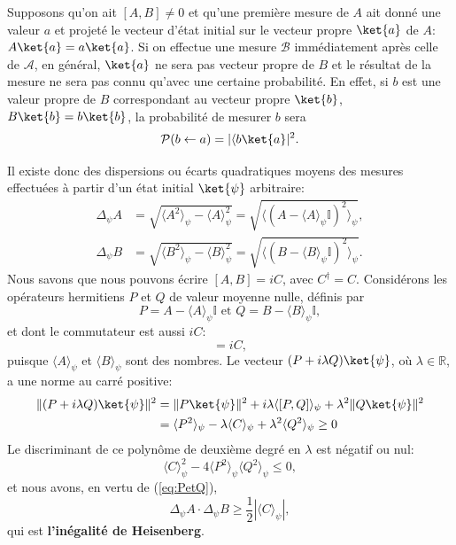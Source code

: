 Supposons qu'on ait $[A,B]\neq0$ et qu'une première mesure de $A$ ait donné une
valeur $a$ et projeté le vecteur d'état initial sur le vecteur propre $\ket{a}$
de $A$: $A\ket{a}=a\ket{a}$. Si on effectue une mesure $\mathcal{B}$
immédiatement après celle de $\mathcal{A}$, en général, $\ket{a}$ ne sera pas
vecteur propre de $B$ et le résultat de la mesure ne sera pas connu qu'avec une
certaine probabilité. En effet, si $b$ est une valeur propre de $B$
correspondant au vecteur propre $\ket{b}$, $B\ket{b}=b\ket{b}$, la probabilité
de mesurer $b$ sera%
\begin{equation}
\mathcal{P}(b\leftarrow a)=|\langle b\ket{a}|^{2}.
\end{equation}

Il existe donc des dispersions ou écarts quadratiques moyens des mesures
effectuées à partir d'un état initial $\ket{\psi}$
arbitraire:%
\begin{subequations}%
\begin{align}
\Delta_{\psi}A  &  =\sqrt{\langle A^{2}\rangle _{\psi}-\langle A\rangle
_{\psi}^{2}}=\sqrt{\langle(A-\langle A\rangle_{\psi}\mathbb{I})
^{2}\rangle_{\psi}},\\
\Delta_{\psi}B  &  =\sqrt{\langle B^{2}\rangle _{\psi}-\langle B\rangle
_{\psi}^{2}}=\sqrt{\langle(B-\langle B\rangle_{\psi}\mathbb{I})
^{2}\rangle _{\psi}}.
\end{align}%
\end{subequations}%
Nous savons que nous pouvons écrire $[A,B]=iC$, avec $C^{\dag}=C$. Considérons
les opérateurs hermitiens $P$ et $Q$ de valeur moyenne nulle, définis par%
\begin{equation}
P=A-\langle A\rangle _{\psi}\mathbb{I}\text{ et }Q=B-\langle B\rangle_{\psi}
\mathbb{I},
\label{eq:PetQ}%
\end{equation}
et dont le commutateur est aussi $iC$:%
\begin{equation}
[P,Q]=iC,
\end{equation}
puisque $\langle A\rangle_{\psi}$ et $\langle B\rangle_{\psi}$ sont des nombres.
Le vecteur $(P+i\lambda Q)\ket{\psi}$, où $\lambda\in\mathbb{R}$, a une norme au
carré positive:%
\begin{equation}
\begin{split}
\|(P+i\lambda Q)\ket{\psi}\|^{2}  &  =\|P\ket{\psi}\|^{2}+i\lambda\langle[P,Q]
\rangle_{\psi}+\lambda^{2}\|Q\ket{\psi}\|^{2}\\
&  =\langle P^{2}\rangle_{\psi}-\lambda\langle C\rangle_{\psi}+\lambda^{2}
\langle Q^{2}\rangle _{\psi}\geq0
\end{split}
\end{equation}
Le discriminant de ce polynôme de deuxième degré en $\lambda$ est négatif ou
nul:
\begin{equation}
\langle C\rangle_{\psi}^{2}-4\langle P^{2}\rangle_{\psi}\langle Q^{2}\rangle
_{\psi}\leq0,
\end{equation}
et nous avons, en vertu de (\ref{eq:PetQ}),%
\begin{equation}
\Delta_{\psi}A\cdot\Delta_{\psi}B\geq\frac{1}{2}|\langle C\rangle _{\psi}|,
\label{eq:IH}%
\end{equation}
qui est \textbf{l'inégalité de Heisenberg}.

